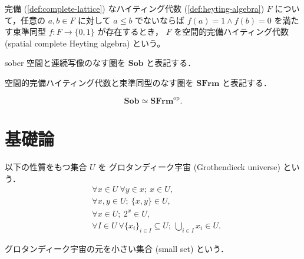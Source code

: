 \documentclass[titlepage]{ltjsreport}
\begin{document}
\begin{definition}[空間的完備ハイティング代数]
  完備
  (\cref{def:complete-lattice})
  なハイティング代数
  (\cref{def:heyting-algebra})
  $F$
  について，任意の
  $a,b\in F$
  に対して
  $a\le b$
  でないならば
  $f(a)=1\wedge f(b)=0$
  を満たす束準同型
  $f:F\to\{0,1\}$
  が存在するとき，
  $F$
  を空間的完備ハイティング代数
  (spatial complete Heyting algebra)
  という。
\end{definition}

\newcommand{\sob}{\mathbf{Sob}}
\newcommand{\sfrm}{\mathbf{SFrm}}

\begin{definition}
  sober 空間と連続写像のなす圏を $\sob$ と表記する．
\end{definition}

\begin{definition}[空間的完備ハイティング代数の圏]
  空間的完備ハイティング代数と束準同型のなす圏を $\sfrm$ と表記する．
\end{definition}

\begin{theorem}[ストーンの双対性定理]
  \begin{equation}
    \sob\simeq\sfrm^\mathrm{op}.
  \end{equation}
\end{theorem}

\appendix

\chapter{基礎論}

\begin{definition}[グロタンディーク宇宙]
  \def\U{U}%
  \def\x{x}%
  \def\y{y}%
  以下の性質をもつ集合 $\U$ を
  グロタンディーク宇宙 (Grothendieck universe) という．
  \begin{align}
     & \forall\x\in\U\ \forall\y\in\x;\ \x\in\U,              \\
     & \forall\x,\y\in\U;\ \{\x,\y\}\in\U,                    \\
     & \forall\x\in\U;\ 2^\x\in\U,                            \\
     & \forall I\in\U\ \forall{\{\x_i\}}_{i\in I}\subseteq\U;
    \ \bigcup_{i\in I}\x_i\in\U.
  \end{align}
\end{definition}

\begin{definition}[小さい集合]\label{def:small-set}
  グロタンディーク宇宙の元を小さい集合 (small set) という．
\end{definition}
\end{document}
